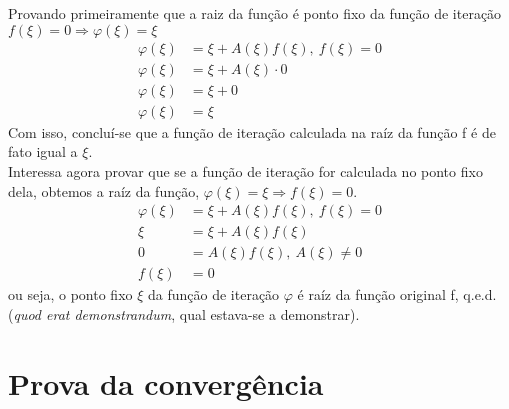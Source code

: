 Provando primeiramente que a raiz da função é ponto fixo da função de iteração $f(\xi) = 0 \Rightarrow \varphi(\xi) = \xi$
\begin{align*}
        \varphi(\xi) &= \xi + A(\xi)f(\xi), \ f(\xi) = 0 \\
        \varphi(\xi) &= \xi + A(\xi) \cdot 0 \\
        \varphi(\xi) &= \xi + 0\\
        \varphi(\xi) &= \xi
\end{align*}
Com isso, concluí-se que a função de iteração calculada na raíz da função f é de fato igual a $\xi$. \\

Interessa agora provar que se a função de iteração for calculada no ponto fixo dela, obtemos a raíz da função, $\varphi(\xi) = \xi \Rightarrow f(\xi) = 0$. 
\begin{align*}
        \varphi(\xi) &= \xi + A(\xi)f(\xi), \ f(\xi) = 0 \\
        \xi &= \xi + A(\xi) f(\xi) \\
        0 &= A(\xi) f(\xi), \ A(\xi) \neq 0 \\
        f(\xi) &= 0
\end{align*}
ou seja, o ponto fixo $\xi$ da função de iteração $\varphi$ é raíz da função original f, q.e.d. (\textit{quod erat demonstrandum}, qual estava-se a demonstrar).

\newpage

\section{Prova da convergência}

